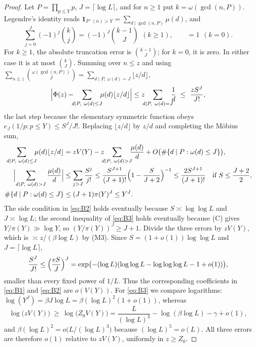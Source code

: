 \documentclass[11pt,a4paper]{article}
\theoremstyle{plain}
\theoremstyle{definition}
\theoremstyle{remark}
\newcommand{\Pm}{P^{-}}
\begin{document}
\begin{proof}
Let $P=\prod_{p\le Y}p$, $J=\lceil\log L\rceil$, and for $n\ge1$ put $k=\omega(\gcd(n,P))$. Legendre's
identity reads $\mathbf1_{\Pm(n)>Y}=\sum_{d\mid\gcd(n,P)}\mu(d)$, and
\[
  \sum_{j=0}^{J}(-1)^{j}\binom kj=(-1)^{J}\binom{k-1}J\ \ (k\ge1),\qquad=1\ \ (k=0).
\]
For $k\ge1$, the absolute truncation error is $\binom{k-1}{J}$; for $k=0$, it is zero.
In either case it is at most $\binom{k}{J}$. Summing over $n\le z$ and using
$\sum_{n\le z}\binom{\omega(\gcd(n,P))}J=\sum_{d\mid P,\ \omega(d)=J}\lfloor z/d\rfloor$,
\begin{equation}\label{eq:B1}
  \Bigl|\Phi(z)-\!\!\!\sum_{d\mid P,\ \omega(d)\le J}\!\!\!\mu(d)\lfloor z/d\rfloor\Bigr|
  \le z\!\!\!\sum_{d\mid P,\ \omega(d)=J}\!\!\!\frac1d\ \le\ \frac{zS^{J}}{J!},
\end{equation}
the last step because the elementary symmetric function obeys $e_{J}(1/p:p\le Y)\le S^{J}/J!$. Replacing
$\lfloor z/d\rfloor$ by $z/d$ and completing the M\"obius sum,
\begin{align}
  \sum_{d\mid P,\ \omega(d)\le J}\!\!\!\mu(d)\lfloor z/d\rfloor
   &=zV(Y)-z\!\!\!\sum_{d\mid P,\ \omega(d)>J}\!\!\!\frac{\mu(d)}d
     +O\bigl(\#\{d\mid P:\omega(d)\le J\}\bigr),\label{eq:B2a}\\
  \Bigl|\sum_{d\mid P,\ \omega(d)>J}\frac{\mu(d)}d\Bigr|
   &\le\sum_{j>J}\frac{S^{j}}{j!}\le\frac{S^{J+1}}{(J+1)!}\Bigl(1-\frac S{J+2}\Bigr)^{-1}
     \le\frac{2S^{J+1}}{(J+1)!}\quad\text{if }S\le\frac{J+2}2,\label{eq:B2}\\
  \#\{d\mid P:\omega(d)\le J\}&\le(J+1)\pi(Y)^{J}\le Y^{J}.\label{eq:B3}
\end{align}
The side condition in \eqref{eq:B2} holds eventually because $S\asymp\log\log L$ and $J\asymp\log L$; the
second inequality of \eqref{eq:B3} holds eventually because (C) gives $Y/\pi(Y)\gg\log Y$, so
$(Y/\pi(Y))^{J}\ge J+1$. Divide the three errors by $zV(Y)$, which is $\asymp z/(\beta\log L)$ by (M3).
Since $S=(1+o(1))\log\log L$ and $J=\lceil\log L\rceil$,
\[
  \frac{S^{J}}{J!}\le\Bigl(\frac{eS}J\Bigr)^{J}
  =\exp\bigl(-(\log L)(\log\log L-\log\log\log L-1+o(1))\bigr),
\]
smaller than every fixed power of $1/L$. Thus the corresponding coefficients in
\eqref{eq:B1} and \eqref{eq:B2} are $o(V(Y))$. For
\eqref{eq:B3} we compare logarithms: $\log(Y^{J})=\beta J\log L=\beta(\log L)^{2}(1+o(1))$, whereas
\[
  \log\bigl(zV(Y)\bigr)\ \ge\ \log\bigl(Z_{0}V(Y)\bigr)
  =\frac L{(\log L)^{3}}-\log(\beta\log L)-\gamma+o(1),
\]
and $\beta(\log L)^{2}=o\bigl(L/(\log L)^{3}\bigr)$ because $(\log L)^{5}=o(L)$. All three errors are
therefore $o(1)$ relative to $zV(Y)$, uniformly in $z\ge Z_{0}$.
\end{proof}
\end{document}
